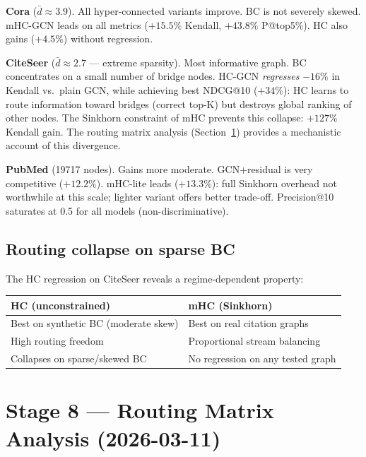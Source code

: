 \documentclass[11pt,a4paper]{article}
\begin{document}
\textbf{Cora} ($\bar{d}\approx3.9$). All hyper-connected variants improve.
BC is not severely skewed. mHC-GCN leads on all metrics
($+15.5\%$ Kendall, $+43.8\%$ P@top5\%).
HC also gains ($+4.5\%$) without regression.

\textbf{CiteSeer} ($\bar{d}\approx2.7$ --- extreme sparsity).
Most informative graph. BC concentrates on a small number of bridge nodes.
HC-GCN \emph{regresses} $-16\%$ in Kendall vs.\ plain GCN,
while achieving best NDCG@10 ($+34\%$):
HC learns to route information toward bridges (correct top-K)
but destroys global ranking of other nodes.
The Sinkhorn constraint of mHC prevents this collapse:
$+127\%$ Kendall gain.
The routing matrix analysis (Section~\ref{sec:matrix-analysis}) provides
a mechanistic account of this divergence.

\textbf{PubMed} (19717 nodes).
Gains more moderate. GCN+residual is very competitive ($+12.2\%$).
mHC-lite leads ($+13.3\%$): full Sinkhorn overhead not worthwhile
at this scale; lighter variant offers better trade-off.
Precision@10 saturates at 0.5 for all models (non-discriminative).

\subsection{Routing collapse on sparse BC}

The HC regression on CiteSeer reveals a regime-dependent property:
\begin{center}
\begin{tabular}{L{5.5cm} L{5.5cm}}
\toprule
\textbf{HC (unconstrained)} & \textbf{mHC (Sinkhorn)} \\
\midrule
Best on synthetic BC (moderate skew) & Best on real citation graphs \\
High routing freedom & Proportional stream balancing \\
Collapses on sparse/skewed BC & No regression on any tested graph \\
\bottomrule
\end{tabular}
\end{center}

\section{Stage 8 --- Routing Matrix Analysis (2026-03-11)}
\label{sec:matrix-analysis}
\end{document}
